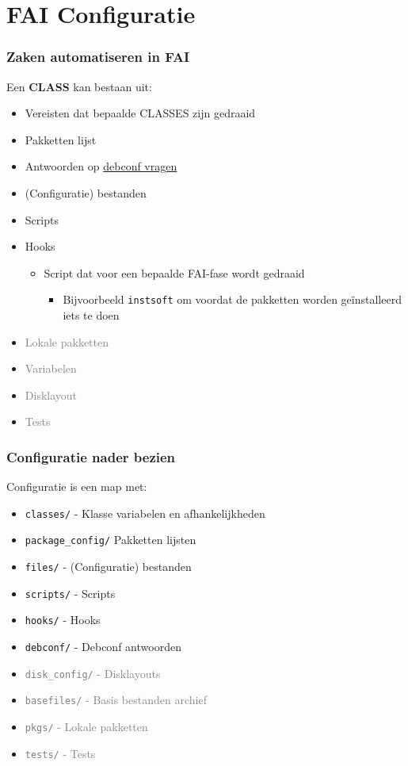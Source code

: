 \documentclass{beamer}
\newcommand{\light}[1]{\textcolor{gray}{#1}}
\begin{document}
\section{FAI Configuratie}


\begin{frame}
\frametitle{Zaken automatiseren in FAI}
Een \textbf{CLASS} kan bestaan uit:
\begin{itemize} 
  \item Vereisten dat bepaalde CLASSES zijn gedraaid
  \item Pakketten lijst
  \item Antwoorden op \href{https://wiki.debian.org/PackageManagement/Preseed}{debconf vragen}
  \item (Configuratie) bestanden
  \item Scripts
  \item<2-> Hooks
  \begin{itemize}
    \item Script dat voor een bepaalde FAI-fase wordt gedraaid
    \begin{itemize}
      \item Bijvoorbeeld \texttt{instsoft} om voordat de pakketten worden geïnstalleerd iets te doen
      \end{itemize}
  \end{itemize}
  \item<3-> \light{Lokale pakketten}
  \item<3-> \light{Variabelen}
  \item<3-> \light{Disklayout}
  \item<3-> \light{Tests}
\end{itemize}
\end{frame}

\begin{frame}
\frametitle{Configuratie nader bezien}
Configuratie is een map met:
\begin{itemize}
  \item \texttt{classes/} - Klasse variabelen en afhankelijkheden
  \item<2-> \texttt{package\_config/}  Pakketten lijsten
  \item<3-> \texttt{files/} - (Configuratie) bestanden
  \item<4-> \texttt{scripts/} - Scripts
  \item<5-> \texttt{hooks/} - Hooks
  \item<6-> \texttt{debconf/} - Debconf antwoorden
  \item<6-> \light{\texttt{disk\_config/} - Disklayouts}
  \item<6-> \light{\texttt{basefiles/} - Basis bestanden archief}
  \item<6-> \light{\texttt{pkgs/} - Lokale pakketten}
  \item<6-> \light{\texttt{tests/} - Tests}
\end{itemize}
\end{frame}
\end{document}
